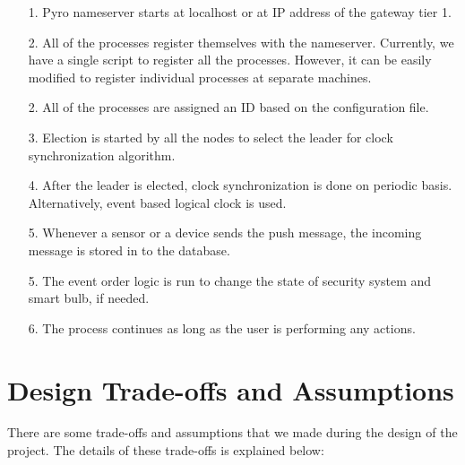 \documentclass[12pt]{article}
\begin{document}
\begin{itemize}
	\item[1.] Pyro nameserver starts at localhost or at IP address of the gateway tier 1.
	
	\item[2.] All of the processes register themselves with the nameserver. Currently, we have a single script to register all the processes. However, it can be easily modified to register individual processes at separate machines. 
	
	\item[2.] All of the processes are assigned an ID based on the configuration file. 
	
	\item[3.] Election is started by all the nodes to select the leader for clock synchronization 
	algorithm. 
	
	\item[4.] After the leader is elected, clock synchronization is done on periodic basis. Alternatively, event based logical clock is used. 
	
	\item[5.] Whenever a sensor or a device sends the push message, the incoming message is
	stored in to the database.
	
	\item[5.] The event order logic is run to change the state of security system
	and smart bulb, if needed. 
	
	\item[6.] The process continues as long as the user is performing any actions. 
\end{itemize}


\section{Design Trade-offs and Assumptions}

There are some trade-offs and assumptions that we made during the design of the project.
The details of these trade-offs is explained below:
\end{document}
